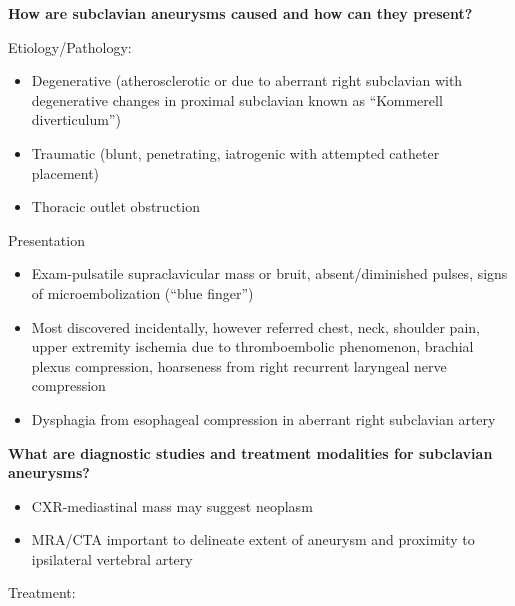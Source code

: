 \documentclass[
]{book}
\providecommand{\tightlist}{%
  \setlength{\itemsep}{0pt}\setlength{\parskip}{0pt}}
\begin{document}
\textbf{How are subclavian aneurysms caused and how can they present?}
\citep{baig84UpperExtremity2019}

Etiology/Pathology:

\begin{itemize}
\item
  Degenerative (atherosclerotic or due to aberrant right subclavian
  with degenerative changes in proximal subclavian known as ``Kommerell
  diverticulum'')
\item
  Traumatic (blunt, penetrating, iatrogenic with attempted catheter
  placement)~
\item
  Thoracic outlet obstruction
\end{itemize}

Presentation

\begin{itemize}
\tightlist
\item
  Exam-pulsatile supraclavicular mass or bruit, absent/diminished
  pulses, signs of microembolization (``blue finger'')
\item
  Most discovered incidentally, however referred chest, neck, shoulder
  pain, upper extremity ischemia due to thromboembolic phenomenon,
  brachial plexus compression, hoarseness from right recurrent
  laryngeal nerve compression
\item
  Dysphagia from esophageal compression in aberrant right subclavian
  artery
\end{itemize}

\textbf{What are diagnostic studies and treatment modalities for subclavian
aneurysms?}

\begin{itemize}
\item
  CXR-mediastinal mass may suggest neoplasm
\item
  MRA/CTA important to delineate extent of aneurysm and proximity to
  ipsilateral vertebral artery~
\end{itemize}

Treatment:~
\end{document}
